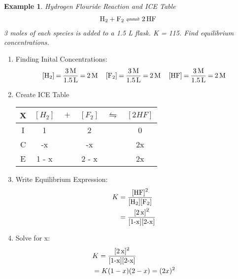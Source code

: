 \documentclass{article}  %
\newtheorem{exmp}{Example}
\begin{document}
\begin{exmp}
    Hydrogen Flouride Reaction and ICE Table 
    \begin{equation*}
        \begin{aligned}
            \ce{H2 + F2 <=> 2HF}
        \end{aligned}
    \end{equation*}
    3 moles of each species is added to a 1.5 L flask. K = 115. Find equilibrium concentrations.
\end{exmp}
\begin{enumerate}
    \item Finding Inital Concentrations:
    \begin{equation*}
        \begin{aligned}
            \ce{[H2] = \frac{3M}{1.5L} =  2M \quad [F2] = \frac{3M}{1.5L} = 2M \quad [HF] = \frac{3M}{1.5L} = 2M}
        \end{aligned}
    \end{equation*}
    \item Create ICE Table \\
    \begin{tabular}{c|c@{}c@{}c@{}c@{}c}
        \hline
        X   &   $[H_2]$ & ${}+{}$ & $[F_2]$ & ${}\leftrightharpoons{}$ & $[2HF]$ \\
        \hline
        I   &       1       &&   2                            &&  0       \\
        C   &       -x      &&   -x                           &&  2x      \\
        E   &       1 - x     &&   2 - x                        &&  2x      \\
        \hline
      \end{tabular}
    \item Write Equilibrium Expression:
    \begin{equation*}
        \begin{aligned}
            K   &= \ce{\frac{[HF]^2}{[H2][F2]}} \\
                &= \ce{\frac{[2x]^2}{[1-x][2-x]}}
        \end{aligned}
    \end{equation*}
    \item Solve for x:
    \begin{equation*}
        \begin{aligned}
            &K = \ce{\frac{[2x]^2}{[1-x][2-x]}} \\
            & = K(1-x)(2-x) = (2x)^2 \\

\end{aligned}
\end{equation*}
\end{enumerate}
\end{document}
